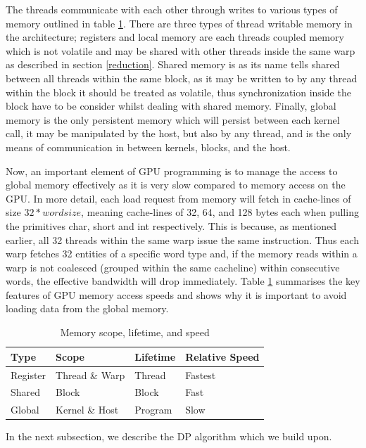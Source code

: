 \documentclass{llncs}
\begin{document}
The threads communicate with each other through writes to various types of memory outlined in table \ref{mem}. There are three types of thread writable memory in the architecture; registers and local memory are each threads coupled memory which is not volatile and may be shared with other threads inside the same warp as described in section \ref{reduction}.  Shared memory is as its name tells shared between all threads within the same block, as it may be written to by any thread within the block it should be treated as volatile, thus synchronization inside the block have to be consider whilst dealing with shared memory. Finally, global memory is the only persistent memory which will persist between each kernel call, it may be manipulated by the host, but also by any thread, and is the only means of communication in between kernels, blocks, and the host.

Now, an important element of GPU programming is to manage the access to global memory effectively as it is very slow compared to memory access on the GPU. In more detail, each load request from memory will fetch in cache-lines of size $32*wordsize$, meaning cache-lines of 32, 64, and 128 bytes each when pulling the primitives char, short and int respectively. This is because, as mentioned earlier, all 32 threads within the same warp issue the same instruction.  Thus each warp fetches 32 entities of a specific word type and, if the memory reads within a warp is not coalesced (grouped within the same cacheline) within consecutive words, the effective bandwidth will drop immediately. Table \ref{mem} summarises the key features of GPU memory access speeds and shows why it is important to avoid loading data from the global memory.

\begin{table}
\centering
\caption{Memory scope, lifetime, and speed \label{mem}}
\begin{tabular}{|l|l|l|l|} \hline
Type&Scope&Lifetime&Relative Speed \\ \hline
Register&Thread \& Warp&Thread&Fastest\\
Shared&Block&Block&Fast\\
Global&Kernel \& Host&Program&Slow\\
\hline\end{tabular}
\end{table}
In the next subsection, we describe the DP algorithm which we build upon.
\end{document}
